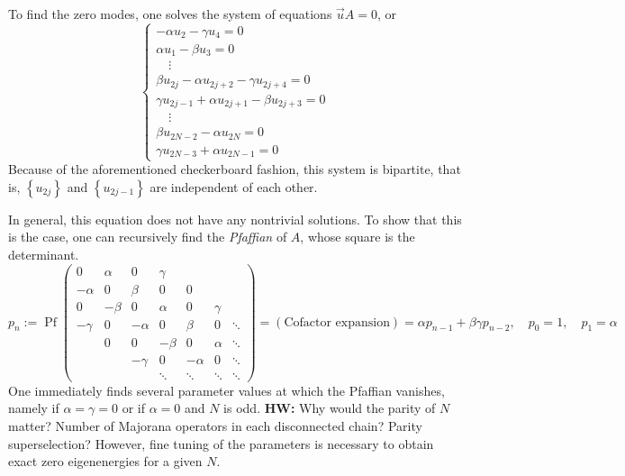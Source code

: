\documentclass{article}
\DeclareMathOperator{\pfaff}{Pf}
\newcommand{\hwnote}[1]{{\color{red}\textbf{HW:} #1}}
\begin{document}
To find the zero modes, one solves the system of equations $\vec{u}A = 0$, or
\[
    \begin{cases}
        -\alpha u_2 - \gamma u_4 = 0 \\
        \alpha u_1 - \beta u_3 = 0 \\
        \quad\vdots \\
        \beta u_{2j} - \alpha u_{2j+2} - \gamma u_{2j+4} = 0 \\
        \gamma u_{2j-1} + \alpha u_{2j+1} - \beta u_{2j+3} = 0 \\
        \quad\vdots \\
        \beta u_{2N-2} - \alpha u_{2N} = 0 \\
        \gamma u_{2N-3} + \alpha u_{2N-1} = 0
    \end{cases}
\]
Because of the aforementioned checkerboard fashion, this system is bipartite,
that is, $\left\{u_{2j}\right\}$ and $\left\{u_{2j-1}\right\}$ are independent of each other.

In general, this equation does not have any nontrivial solutions.
To show that this is the case, one can recursively find the \emph{Pfaffian} of $A$,
whose square is the determinant.
\[
    p_n := \pfaff \begin{pmatrix}
        0       & \alpha & 0       & \gamma  &         &        &        \\
        -\alpha & 0      & \beta   & 0       & 0       &        &        \\
        0       & -\beta & 0       & \alpha  & 0       & \gamma &        \\
        -\gamma & 0      & -\alpha & 0       & \beta   & 0      & \ddots \\
                & 0      & 0       & -\beta  & 0       & \alpha & \ddots \\
                &        & -\gamma & 0       & -\alpha & 0      & \ddots \\
                &        &         & \ddots  & \ddots  & \ddots & \ddots
    \end{pmatrix}
    = (\text{Cofactor expansion})
    = \alpha p_{n-1} + \beta\gamma p_{n-2},\quad
    p_0 = 1,\quad
    p_1 = \alpha
\]
One immediately finds several parameter values at which the Pfaffian vanishes,
namely if $\alpha = \gamma = 0$ or if $\alpha = 0$ and $N$ is odd.
\hwnote{Why would the parity of $N$ matter? Number of Majorana operators in each disconnected chain? Parity superselection?}
However, fine tuning of the parameters is necessary to obtain exact zero eigenenergies for a given $N$.
\end{document}
